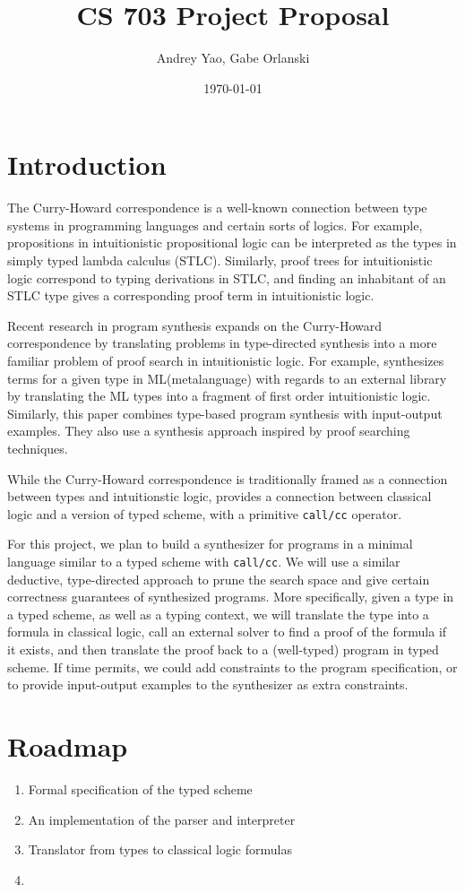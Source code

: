 \documentclass[12pt]{article}
\title{CS 703 Project Proposal}
\author{Andrey Yao, Gabe Orlanski}
\date{\today}
\begin{document}
\maketitle

\section{Introduction}

The Curry-Howard correspondence is a well-known connection between type systems in programming languages and certain sorts of logics. For example, propositions in intuitionistic propositional logic can be interpreted as the types in simply typed lambda calculus (STLC). Similarly, proof trees for intuitionistic logic correspond to typing derivations in STLC, and finding an inhabitant of an STLC type gives a corresponding proof term in intuitionistic logic.

Recent research in program synthesis expands on the Curry-Howard correspondence by translating problems in type-directed synthesis into a more familiar problem of proof search in intuitionistic logic. For example, \cite{benke2016SynthesisFunctionalPrograms} synthesizes terms for a given type in ML(metalanguage) with regards to an external library by translating the ML types into a fragment of first order intuitionistic logic. Similarly, this paper \cite{osera2015TypeandexampledirectedProgramSynthesis} combines type-based program synthesis with input-output examples. They also use a synthesis approach inspired by proof searching techniques.

While the Curry-Howard correspondence is traditionally framed as a connection between types and intuitionstic logic, \cite{griffin1989FormulaeastypeNotionControl} provides a connection between classical logic and a version of typed scheme, with a primitive \texttt{call/cc} operator.

For this project, we plan to build a synthesizer for programs in a minimal language similar to a typed scheme with \texttt{call/cc}. We will use a similar deductive, type-directed approach to prune the search space and give certain correctness guarantees of synthesized programs. More specifically, given a type in a typed scheme, as well as a typing context, we will translate the type into a formula in classical logic, call an external solver to find a proof of the formula if it exists, and then translate the proof back to a (well-typed) program in typed scheme. If time permits, we could add constraints to the program specification, or to provide input-output examples to the synthesizer as extra constraints.


\section{Roadmap}

\begin{enumerate}
\item Formal specification of the typed scheme
\item An implementation of the parser and interpreter
\item Translator from types to classical logic formulas
\item
\end{enumerate}

\printbibliography
\end{document}
